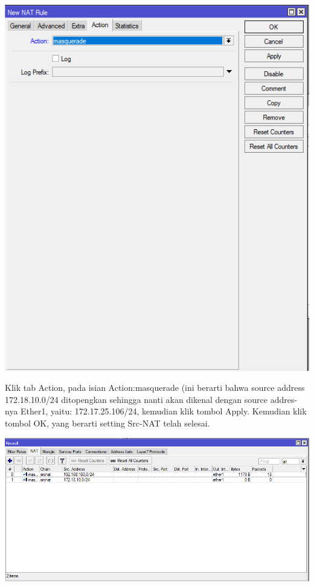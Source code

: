 \documentclass[a4paper,12pt]{article}
\begin{document}
\begin{center}
	\includegraphics[scale=.5]{lat2}
\end{center}
Klik tab Action, pada isian Action:masquerade (ini berarti bahwa source address 172.18.10.0/24 ditopengkan sehingga nanti akan dikenal dengan source addres-nya Ether1, yaitu: 172.17.25.106/24, kemudian klik tombol Apply.
Kemudian klik tombol OK, yang berarti setting Src-NAT telah selesai.
\begin{center}
	\includegraphics[scale=.5]{lat3}
\end{center}
\end{document}
